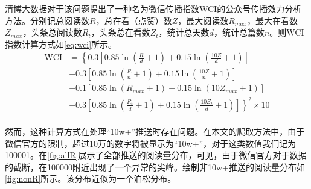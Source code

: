 \documentclass[a4paper,12pt,UTF8]{article}
\begin{document}
    清博大数据对于该问题提出了一种名为微信传播指数WCI的公众号传播效力分析方法\cite{清博大数据2020}。分别记总阅读数$R$，总在看（点赞）数$Z$，最大阅读数$R_{max}$，最大在看数$Z_{max}$，头条总阅读数$R_t$，头条总在看数$Z_t$，统计总天数$d$，统计总篇数$n$。则WCI指数计算方式如\cref{eq:wci}所示。
    \begin{equation}
      \label{eq:wci}
      \begin{aligned}
        \text{WCI} &= \left\{ 0.3\left[0.85 \ln (\frac{R}{d} + 1)+ 0.15 \ln (\frac{10Z}{d} + 1)\right] \right. \\
                   &+ 0.3\left[0.85 \ln (\frac{R}{n} + 1)+ 0.15 \ln (\frac{10Z}{n} + 1)\right] \\
                   &+ 0.1\left[0.85 \ln (R_{max} + 1)+ 0.15 \ln (10Z_{max} + 1)\right] \\
                   &\left. + 0.3\left[0.85 \ln (\frac{R_t}{d} + 1)+ 0.15 \ln (\frac{10Z_t}{d} + 1)\right]  \right\} ^ 2 \times 10 \\
      \end{aligned}
    \end{equation}

    然而，这种计算方式在处理“10w+”推送时存在问题。在本文的爬取方法中，由于微信官方的限制，超过10万的数字将被显示为“10w+”，对于这类数值我们记为100001。在\cref{fig:allR}展示了全部推送的阅读量分布，可见，由于微信官方对于数据的截断，在100000附近出现了一个异常的尖峰。绘制非10w+推送的阅读量分布如\cref{fig:nonR}所示。该分布近似为一个泊松分布。
    
\end{document}
